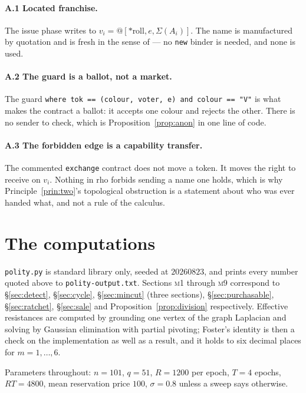 \documentclass[11pt]{article}
\makeatletter
\theoremstyle{plain}
\theoremstyle{definition}
\theoremstyle{remark}
\newcommand{\Sig}{\Sigma}
\newcommand{\quo}[1]{@#1}
\newcommand{\drop}[1]{*#1}
\makeatother
\begin{document}
\paragraph{A.1 Located franchise.} The issue phase writes to
$v_i = \quo{[\drop{\text{roll}}, e, \Sig(A_i)]}$. The name is manufactured by
quotation and is fresh in the sense of \cite[\S3]{scientist} --- no
\texttt{new} binder is needed, and none is used.

\paragraph{A.2 The guard is a ballot, not a market.} The guard
\texttt{where tok == (colour, voter, e) and colour == "V"} is what makes the
contract a ballot: it accepts one colour and rejects the other. There is no
sender to check, which is Proposition~\ref{prop:anon} in one line of code.

\paragraph{A.3 The forbidden edge is a capability transfer.} The commented
\texttt{exchange} contract does not move a token. It moves the right to receive
on $v_i$. Nothing in rho forbids sending a name one holds, which is why
Principle~\ref{prin:two}'s topological obstruction is a statement about who was
ever handed what, and not a rule of the calculus.

\section{The computations}
\label{app:computations}

\texttt{polity.py} is standard library only, seeded at $20260823$, and prints
every number quoted above to \texttt{polity-output.txt}. Sections \textsc{m1}
through \textsc{m9} correspond to \S\ref{sec:detect}, \S\ref{sec:cycle},
\S\ref{sec:mincut} (three sections), \S\ref{sec:purchasable},
\S\ref{sec:ratchet}, \S\ref{sec:sale} and
Proposition~\ref{prop:division} respectively. Effective resistances are computed
by grounding one vertex of the graph Laplacian and solving by Gaussian
elimination with partial pivoting; Foster's identity is then a check on the
implementation as well as a result, and it holds to six decimal places for
$m = 1,\dots,6$.

Parameters throughout: $n = 101$, $q = 51$, $R = 1200$ per epoch, $T = 4$
epochs, $RT = 4800$, mean reservation price $100$, $\sigma = 0.8$ unless a
sweep says otherwise.
\end{document}
